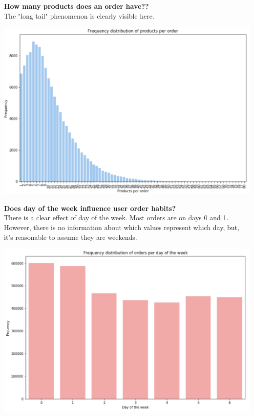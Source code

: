 \documentclass[12pt]{article}
\begin{document}
\noindent
\textbf{How many products does an order have??} \\
The "long tail" phenomenon is clearly visible here.
\begin{center}
	\includegraphics[scale=0.2]{train_products_order}
\end{center} 

\newpage
\noindent
\textbf{Does day of the week influence user order habits?} \\
There is a clear effect of day of the week. Most orders are on days 0 and 1. However, there is no information about which values represent which day, but, it's reasonable to assume they are weekends.
\begin{center}
	\includegraphics[scale=0.2]{order_dow}
\end{center}
\end{document}
